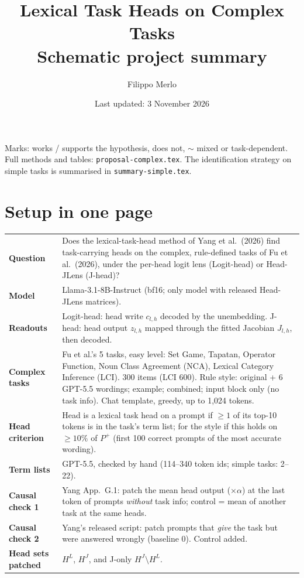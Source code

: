 \documentclass[10pt,a4paper]{article}
\title{Lexical Task Heads on Complex Tasks\\\large Schematic project summary}
\author{Filippo Merlo}
\date{Last updated: 3 November 2026}
\newcommand{\yes}{\textcolor{green!45!black}{\ding{51}}}
\newcommand{\no}{\textcolor{red!70!black}{\ding{55}}}
\newcommand{\mixed}{\textcolor{orange!80!black}{$\sim$}}
\begin{document}
\maketitle
\vspace{-1em}


\noindent Marks: \yes{} works / supports the hypothesis, \no{} does not, \mixed{} mixed or task-dependent. Full methods and tables: \texttt{proposal-complex.tex}. The identification strategy on simple tasks is summarised in \texttt{summary-simple.tex}.

\section{Setup in one page}

\begin{tabularx}{\textwidth}{@{}>{\raggedright\arraybackslash\bfseries}p{2.8cm}L@{}}
\toprule
Question & Does the lexical-task-head method of Yang et al.\ (2026) find task-carrying heads on the complex, rule-defined tasks of Fu et al.\ (2026), under the per-head logit lens (Logit-head) or Head-JLens (J-head)? \\
Model & Llama-3.1-8B-Instruct (bf16; only model with released Head-JLens matrices). \\
Readouts & Logit-head: head write $c_{l,h}$ decoded by the unembedding. J-head: head output $z_{l,h}$ mapped through the fitted Jacobian $J_{l,h}$, then decoded. \\
Complex tasks & Fu et al.'s 5 tasks, easy level: Set Game, Tapatan, Operator Function, Noun Class Agreement (NCA), Lexical Category Inference (LCI). 300 items (LCI 600). Rule style: original + 6 GPT-5.5 wordings; example; combined; input block only (no task info). Chat template, greedy, up to 1,024 tokens. \\
Head criterion & Head is a lexical task head on a prompt if $\geq 1$ of its top-10 tokens is in the task's term list; for the style if this holds on $\geq 10\%$ of $P^+$ (first 100 correct prompts of the most accurate wording). \\
Term lists & GPT-5.5, checked by hand (114--340 token ids; simple tasks: 2--22). \\
Causal check 1 & Yang App.~G.1: patch the mean head output ($\times\alpha$) at the last token of prompts \emph{without} task info; control = mean of another task at the same heads. \\
Causal check 2 & Yang's released script: patch prompts that \emph{give} the task but were answered wrongly (baseline 0). Control added. \\
Head sets patched & $H^L$, $H^J$, and J-only $H^J\setminus H^L$. \\
\bottomrule
\end{tabularx}
\end{document}

